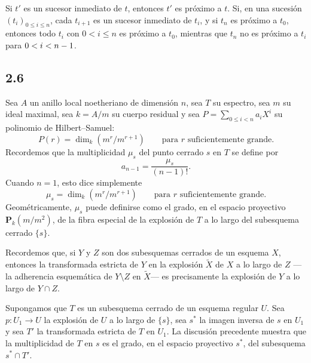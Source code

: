 Si $t'$ es un sucesor inmediato de $t$, entonces $t'$ es próximo a $t$. Si, en
una sucesión $(t_i)_{0\leq i\leq n}$, cada $t_{i+1}$ es un sucesor inmediato de
$t_i$, y si $t_n$ es próximo a $t_0$, entonces todo $t_i$ con $0<i\leq n$ es
próximo a $t_0$, mientras que $t_n$ no es próximo a $t_i$ para
$0<i< n-1$.

\subsection*{2.6}
Sea $A$ un anillo local noetheriano de dimensión $n$, sea $T$ su espectro, sea
$m$ su ideal maximal, sea $k=A/m$ su cuerpo residual y sea
$P=\sum_{0\leq i<n}a_iX^i$ su polinomio de Hilbert--Samuel:
\begin{equation*}
P(r)=\dim_k(m^r/m^{r+1})\qquad\text{para }r\text{ suficientemente grande}.
\end{equation*}
Recordemos que la multiplicidad $\mu_s$ del punto cerrado $s$ en $T$ se define
por
\begin{equation*}
a_{n-1}=\frac{\mu_s}{(n-1)!}.
\end{equation*}
Cuando $n=1$, esto dice simplemente
\begin{equation*}
\mu_s=\dim_k(m^r/m^{r+1})\qquad\text{para }r\text{ suficientemente grande}.
\end{equation*}
Geométricamente, $\mu_s$ puede definirse como el grado, en el espacio proyectivo
$\mathbf P_k(m/m^2)$, de la fibra especial de la explosión de $T$ a lo largo del
subesquema cerrado $\{s\}$.

\pageoriginale

Recordemos que, si $Y$ y $Z$ son dos subesquemas cerrados de un esquema $X$,
entonces la transformada estricta de $Y$ en la explosión $\widetilde X$ de $X$
a lo largo de $Z$ ---la adherencia esquemática de $Y\setminus Z$ en
$\widetilde X$--- es precisamente la explosión de $Y$ a lo largo de
$Y\cap Z$.

Supongamos que $T$ es un subesquema cerrado de un esquema regular $U$. Sea
$p:U_1\longrightarrow U$ la explosión de $U$ a lo largo de $\{s\}$, sea $s^*$
la imagen inversa de $s$ en $U_1$ y sea $T'$ la transformada estricta de $T$ en
$U_1$. La discusión precedente muestra que la multiplicidad de $T$ en $s$ es el
grado, en el espacio proyectivo $s^*$, del subesquema $s^*\cap T'$.

